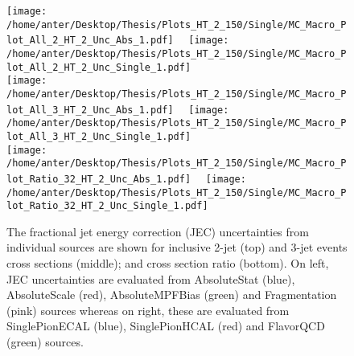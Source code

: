 \begin{figure}[!hbtp]
\hspace*{-5mm}\texttt{[image: /home/anter/Desktop/Thesis/Plots\_HT\_2\_150/Single/MC\_Macro\_Plot\_All\_2\_HT\_2\_Unc\_Abs\_1.pdf]}%
~~\texttt{[image: /home/anter/Desktop/Thesis/Plots\_HT\_2\_150/Single/MC\_Macro\_Plot\_All\_2\_HT\_2\_Unc\_Single\_1.pdf]}\\
\hspace*{-5mm}\texttt{[image: /home/anter/Desktop/Thesis/Plots\_HT\_2\_150/Single/MC\_Macro\_Plot\_All\_3\_HT\_2\_Unc\_Abs\_1.pdf]}%
~~\texttt{[image: /home/anter/Desktop/Thesis/Plots\_HT\_2\_150/Single/MC\_Macro\_Plot\_All\_3\_HT\_2\_Unc\_Single\_1.pdf]}\\
\hspace*{-5mm}\texttt{[image: /home/anter/Desktop/Thesis/Plots\_HT\_2\_150/Single/MC\_Macro\_Plot\_Ratio\_32\_HT\_2\_Unc\_Abs\_1.pdf]}%
~~\texttt{[image: /home/anter/Desktop/Thesis/Plots\_HT\_2\_150/Single/MC\_Macro\_Plot\_Ratio\_32\_HT\_2\_Unc\_Single\_1.pdf]}
\caption{The fractional jet energy correction (JEC) uncertainties from individual sources are shown for inclusive 2-jet (top) and 3-jet events cross sections (middle); and cross section ratio \ratio (bottom). On left, JEC uncertainties are evaluated from AbsoluteStat (blue), AbsoluteScale (red), AbsoluteMPFBias (green) and Fragmentation (pink) sources whereas on right, these are evaluated from SinglePionECAL (blue), SinglePionHCAL (red) and FlavorQCD (green) sources.}
\label{fig:jes1}
\end{figure}

